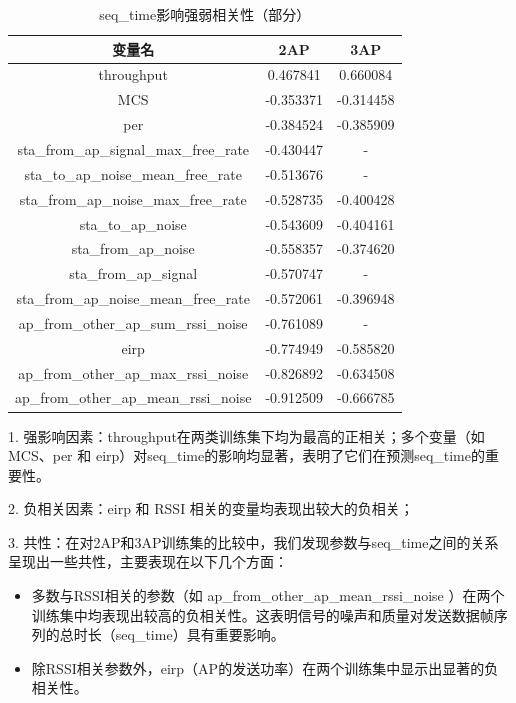 \documentclass[bwprint]{gmcmthesis}
\begin{document}
\begin{longtable}{ccc}
	\caption{seq\_time影响强弱相关性（部分）}\\
	\hline
	\textbf{变量名} & \textbf{2AP} & \textbf{3AP} \\ 
	\hline
	throughput                          & 0.467841      & 0.660084      \\
	MCS                                & -0.353371     & -0.314458     \\
	per                                & -0.384524     & -0.385909     \\
	sta\_from\_ap\_signal\_max\_free\_rate & -0.430447     & -            \\
	sta\_to\_ap\_noise\_mean\_free\_rate & -0.513676     & -            \\
	sta\_from\_ap\_noise\_max\_free\_rate  & -0.528735     & -0.400428     \\
	sta\_to\_ap\_noise                    & -0.543609     & -0.404161     \\
	sta\_from\_ap\_noise                  & -0.558357     & -0.374620     \\
	sta\_from\_ap\_signal                 & -0.570747     & -            \\
	sta\_from\_ap\_noise\_mean\_free\_rate & -0.572061     & -0.396948     \\
	ap\_from\_other\_ap\_sum\_rssi\_noise & -0.761089     & -            \\
	eirp                               & -0.774949     & -0.585820     \\
	ap\_from\_other\_ap\_max\_rssi\_noise & -0.826892     & -0.634508     \\
	ap\_from\_other\_ap\_mean\_rssi\_noise & -0.912509     & -0.666785     \\ 
	\hline
\end{longtable}

1. 强影响因素：throughput在两类训练集下均为最高的正相关；多个变量（如 MCS、per 和 eirp）对seq\_time的影响均显著，表明了它们在预测seq\_time的重要性。

2. 负相关因素：eirp 和 RSSI 相关的变量均表现出较大的负相关；

3. 共性：在对2AP和3AP训练集的比较中，我们发现参数与seq\_time之间的关系呈现出一些共性，主要表现在以下几个方面：

\begin{itemize}
	\item 多数与RSSI相关的参数（如 ap\_from\_other\_ap\_mean\_rssi\_noise ）在两个训练集中均表现出较高的负相关性。这表明信号的噪声和质量对发送数据帧序列的总时长（seq\_time）具有重要影响。
	\item 除RSSI相关参数外，eirp（AP的发送功率）在两个训练集中显示出显著的负相关性。
\end{itemize}
\end{document}
